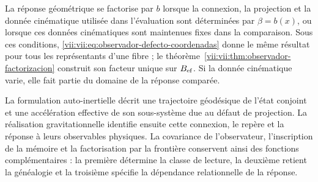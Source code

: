La réponse géométrique se factorise par \(b\) lorsque la connexion,
la projection et la donnée cinématique utilisée dans l'évaluation sont
déterminées par \(\beta=b(x)\), ou lorsque ces données cinématiques sont
maintenues fixes dans la comparaison. Sous ces conditions,
\eqref{vii:vii:eq:observador-defecto-coordenadas} donne le même résultat
pour tous les représentants d'une fibre ; le
théorème~\ref{vii:vii:thm:observador-factorizacion} construit son facteur
unique sur \(B_{\rm ef}\). Si la donnée cinématique varie, elle
fait partie du domaine de la réponse comparée.

La formulation auto-inertielle décrit une trajectoire géodésique de
l'état conjoint et une accélération effective de son sous-système due
au défaut de projection. La réalisation gravitationnelle identifie
ensuite cette connexion, le repère et la réponse à leurs observables
physiques. La covariance de l'observateur, l'inscription de la mémoire et
la factorisation par la frontière conservent ainsi des fonctions complémentaires :
la première détermine la classe de lecture, la deuxième retient la
généalogie et la troisième spécifie la dépendance relationnelle de la
réponse.
